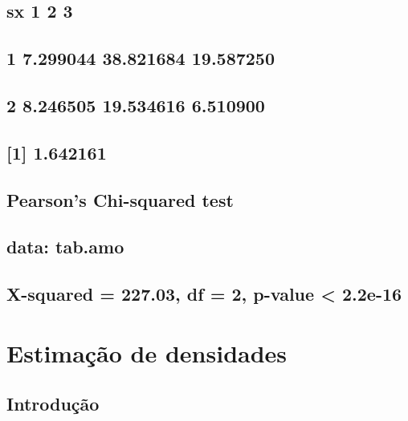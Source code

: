 \documentclass[]{book}
\theoremstyle{definition}
\theoremstyle{definition}
\theoremstyle{definition}
\theoremstyle{remark}
\begin{document}
\section{sx 1 2 3}\label{sx-1-2-3-2}

\section{1 7.299044 38.821684 19.587250}\label{section-64}

\section{2 8.246505 19.534616 6.510900}\label{section-65}

\section{{[}1{]} 1.642161}\label{section-66}

\section{}\label{section-67}

\section{Pearson's Chi-squared test}\label{pearsons-chi-squared-test}

\section{}\label{section-68}

\section{data: tab.amo}\label{data-tab.amo}

\section{X-squared = 227.03, df = 2, p-value \textless{}
2.2e-16}\label{x-squared-227.03-df-2-p-value-2.2e-16}

\chapter{Estimação de densidades}\label{estimacao-de-densidades}

\section{Introdução}\label{introducao-3}
\end{document}

